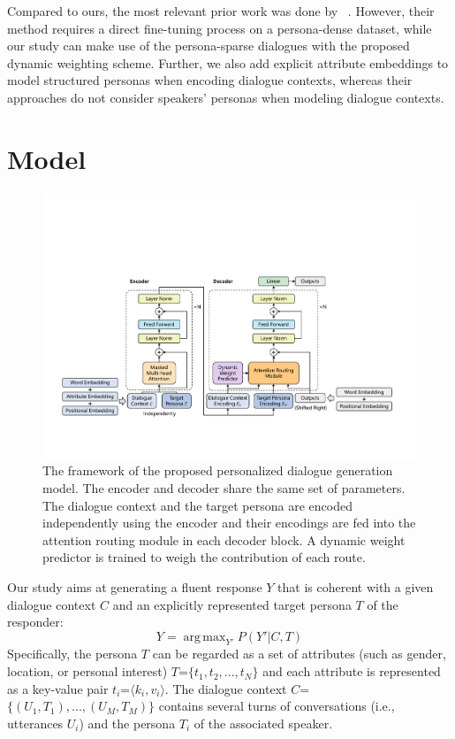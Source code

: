 \documentclass[letterpaper]{article}
\newcommand{\citet}[1]{\citeauthor{#1} \shortcite{#1}}
\DeclareMathOperator*{\argmax}{arg\,max}
\begin{document}
Compared to ours, the most relevant prior work was done by~\citet{golovanov-etal-2019-large}. However, their method requires a direct fine-tuning process on a persona-dense dataset, while our study can make use of the persona-sparse dialogues with the proposed dynamic weighting scheme. Further, we also add explicit attribute embeddings to model structured personas when encoding dialogue contexts, whereas their approaches do not consider speakers' personas when modeling dialogue contexts.

\section{Model}
\begin{figure}[t]
    \centering
    \includegraphics[width=430px]{figures/fig_model.pdf}
    \caption{The framework of the proposed personalized dialogue generation model. The encoder and decoder share the same set of parameters. The dialogue context and the target persona are encoded independently using the encoder and their encodings are fed into the attention routing module in each decoder block. A dynamic weight predictor is trained to weigh the contribution of each route.}
    \label{fig:model_arch}
\end{figure}

Our study aims at generating a fluent response $Y$ that is coherent with a given dialogue context $C$ and an explicitly represented target persona $T$ of the responder:
\begin{equation}
    Y = \argmax_{Y'} P({Y'}|C, T)
\end{equation}
Specifically, the persona $T$ can be regarded as a set of attributes (such as gender, location, or personal interest) $T$=$\{t_1, t_2, ..., t_N\}$ and each attribute is represented as a key-value pair $t_i$=$\langle k_i, v_i\rangle$. The dialogue context $C$=$\{(U_1, T_1), ..., (U_M, T_M)\}$ contains several turns of conversations (i.e., utterances $U_i$) and the persona $T_i$ of the associated speaker.
\end{document}
